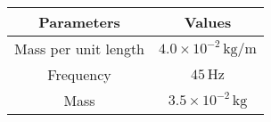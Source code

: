 
    \begin{tabular}{|c|c|}
        \hline
        \textbf{Parameters} & \textbf{Values} \\
        \hline
        Mass per unit length & $4.0 \times 10^{-2} \, \text{kg/m}$ \\

        \hline
        Frequency & $45 \, \text{Hz}$ \\
        \hline
        Mass & $3.5 \times 10^{-2} \, \text{kg}$ \\
        \hline
    \end{tabular}
    

